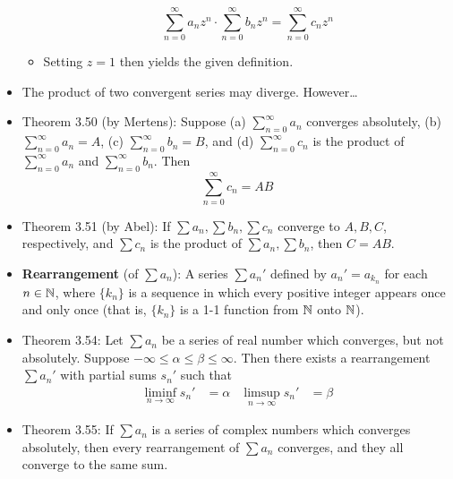 \documentclass[../../notes.tex]{subfiles}
\begin{document}
\begin{itemize}
\begin{itemize}
        \begin{equation*}
            \sum_{n=0}^\infty a_nz^n\cdot\sum_{n=0}^\infty b_nz^n = \sum_{n=0}^\infty c_nz^n
        \end{equation*}
        \item Setting $z=1$ then yields the given definition.
    \end{itemize}
    \item The product of two convergent series may diverge. However\dots
    \item Theorem 3.50 (by Mertens): Suppose (a) $\sum_{n=0}^\infty a_n$ converges absolutely, (b) $\sum_{n=0}^\infty a_n=A$, (c) $\sum_{n=0}^\infty b_n=B$, and (d) $\sum_{n=0}^\infty c_n$ is the product of $\sum_{n=0}^\infty a_n$ and $\sum_{n=0}^\infty b_n$. Then
    \begin{equation*}
        \sum_{n=0}^\infty c_n = AB
    \end{equation*}
    \item Theorem 3.51 (by Abel): If $\sum a_n,\sum b_n,\sum c_n$ converge to $A,B,C$, respectively, and $\sum c_n$ is the product of $\sum a_n,\sum b_n$, then $C=AB$.
    \item \textbf{Rearrangement} (of $\sum a_n$): A series $\sum a_n'$ defined by $a_n'=a_{k_n}$ for each $n\in\mathbb{N}$, where $\{k_n\}$ is a sequence in which every positive integer appears once and only once (that is, $\{k_n\}$ is a 1-1 function from $\mathbb{N}$ onto $\mathbb{N}$).
    \item Theorem 3.54: Let $\sum a_n$ be a series of real number which converges, but not absolutely. Suppose $-\infty\leq\alpha\leq\beta\leq\infty$. Then there exists a rearrangement $\sum a_n'$ with partial sums $s_n'$ such that
    \begin{align*}
        \liminf_{n\to\infty}s_n' &= \alpha&
        \limsup_{n\to\infty}s_n' &= \beta
    \end{align*}
    \item Theorem 3.55: If $\sum a_n$ is a series of complex numbers which converges absolutely, then every rearrangement of $\sum a_n$ converges, and they all converge to the same sum.
\end{itemize}
\end{document}
